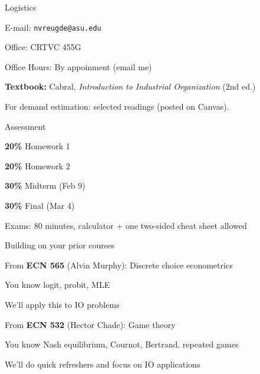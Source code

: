 \documentclass[notes,11pt, aspectratio=169]{beamer}
\newenvironment{wideitemize}{\itemize\addtolength{\itemsep}{10pt}}{\enditemize}
\begin{document}
\begin{frame}{Logistics}
	\begin{wideitemize}
		\item E-mail: \texttt{nvreugde@asu.edu}
		\item Office: CRTVC 455G
		\item Office Hours: By appoinment (email me)
	\end{wideitemize}
	\vspace{11pt}
	\begin{wideitemize}
		\item \textbf{Textbook:} Cabral, \textit{Introduction to Industrial Organization} (2nd ed.)
		\item For demand estimation: selected readings (posted on Canvas).
	\end{wideitemize}
\end{frame}

\begin{frame}{Assessment}
	\begin{wideitemize}
		\item \textbf{20\%} Homework 1
		\item \textbf{20\%} Homework 2 
		\item \textbf{30\%} Midterm (Feb 9)
		\item \textbf{30\%} Final (Mar 4)
	\end{wideitemize}
	\vspace{11pt}
	\begin{wideitemize}
		\item Exams: 80 minutes, calculator + one two-sided cheat sheet allowed
	\end{wideitemize}
\end{frame}

\begin{frame}{Building on your prior courses}
	\begin{wideitemize}
		\item From \textbf{ECN 565} (Alvin Murphy): Discrete choice econometrics
		\begin{wideitemize}
			\vspace{5pt}
			\item You know logit, probit, MLE
			\item We'll apply this to IO problems
		\end{wideitemize}
		\item From \textbf{ECN 532} (Hector Chade): Game theory
		\begin{wideitemize}
			\vspace{5pt}
			\item You know Nash equilibrium, Cournot, Bertrand, repeated games
			\item We'll do quick refreshers and focus on IO applications
		\end{wideitemize}
	\end{wideitemize}
\end{frame}
\end{document}
